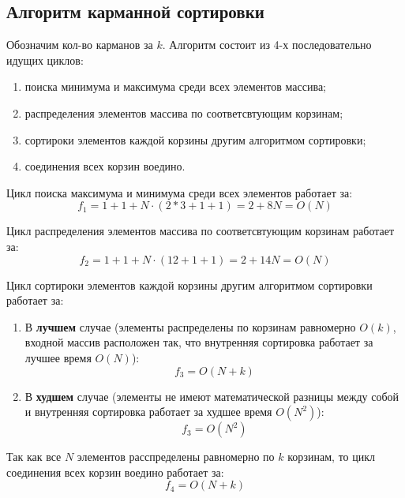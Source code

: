 \documentclass[12pt]{report}
\begin{document}
	\subsection{Алгоритм карманной сортировки}
	
	Обозначим кол-во карманов за $k$. Алгоритм состоит из 4-х последовательно идущих циклов: 
	\begin{enumerate}
		\item поиска минимума и максимума среди всех элементов массива;
		\item распределения элементов массива по соответсвтующим корзинам;
		\item сортироки элементов каждой корзины другим алгоритмом сортировки;
		\item соединения всех корзин воедино.
	\end{enumerate}
	
	Цикл поиска максимума и минимума среди всех элементов работает за:
	\begin{equation}
		f_{1} = 1 + 1 + N\cdot(2 * 3 + 1 + 1) = 2 + 8N = O(N)
	\end{equation}
	
	Цикл распределения элементов массива по соответсвтующим корзинам работает за:
	\begin{equation}
		f_{2} = 1 + 1 + N\cdot(12 + 1 + 1) = 2 + 14N = O(N)
	\end{equation}
	
	Цикл сортироки элементов каждой корзины другим алгоритмом сортировки работает за:
	\begin{enumerate}
		\item В \textbf{лучшем} случае (элементы распределены по корзинам равномерно $O(k)$, входной массив расположен так, что внутренняя сортировка работает за лучшее время $O(N)$):
		\begin{equation}
		f_{3} = O(N + k)
		\end{equation}
		\item В \textbf{худшем} случае (элементы не имеют математической разницы между собой и внутренняя сортировка работает за худшее время $O(N^2)$):
		\begin{equation}
		f_{3} = O(N^2)
		\end{equation}
	\end{enumerate}
	
	Так как все $N$ элементов расспределены равномерно по $k$ корзинам, то цикл соединения всех корзин воедино работает за:
	\begin{equation}
		f_{4} = O(N + k)
	\end{equation}
	
\end{document}
